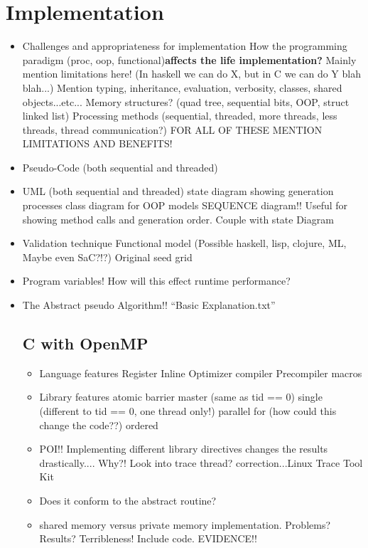 \documentclass[11pt]{article} %
\begin{document}
\section{Implementation}
\begin{itemize}
\item Challenges and appropriateness for implementation
\subitem How the programming paradigm (proc, oop, functional){\bf affects the life implementation?} Mainly mention limitations here! (In haskell we can do X, but in C we can do Y blah blah...) Mention typing, inheritance, evaluation, verbosity, classes, shared objects...etc...
\subitem Memory structures? (quad tree, sequential bits, OOP, struct linked list)
\subitem Processing methods (sequential, threaded, more threads, less threads, thread communication?)
\subitem FOR ALL OF THESE MENTION LIMITATIONS AND BENEFITS!
\item Pseudo-Code (both sequential and threaded)
\item UML (both sequential and threaded)
\subitem state diagram showing generation processes
\subitem class diagram for OOP models
\subitem SEQUENCE diagram!! Useful for showing method calls and generation order. Couple with state Diagram
\item Validation technique
\subitem Functional model (Possible haskell, lisp, clojure, ML, Maybe even SaC?!?)
\subitem Original seed grid
\item Program variables!
\subitem How will this effect runtime performance?
\item The Abstract pseudo Algorithm!!
\subitem ``Basic Explanation.txt''
\subsection{C with OpenMP}
\begin{itemize}
\item Language features
\subitem Register
\subitem Inline
\subitem Optimizer compiler
\subitem Precompiler macros
\item Library features
\subitem atomic
\subitem barrier
\subitem master (same as tid == 0)
\subitem single (different to tid == 0, one thread only!)
\subitem parallel
\subitem for (how could this change the code??)
\subitem ordered
\item POI!! Implementing different library directives changes the results drastically.... Why?! Look into trace thread? correction...Linux Trace Tool Kit
\item Does it conform to the abstract routine?
\item shared memory versus private memory implementation. Problems? Results? Terribleness! Include code. EVIDENCE!!
\end{itemize} 


\end{itemize}
\end{document}
